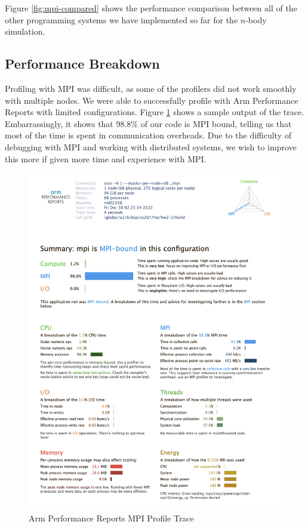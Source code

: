 \documentclass{article}
\begin{document}
Figure \ref{fig:mpi-compared} shows the performance comparison between all of the other programming systems we have implemented so far for the $n$-body simulation.

\subsection{Performance Breakdown}

Profiling with MPI was difficult, as some of the profilers did not work smoothly with multiple nodes. We were able to successfully profile with Arm Performance Reports with limited configurations. Figure \ref{fig:mpi-profile-trace} shows a sample output of the trace. Embarrassingly, it shows that 98.8\% of our code is MPI bound, telling us that most of the time is spent in communication overheads. Due to the difficulty of debugging with MPI and working with distributed systems, we wish to improve this more if given more time and experience with MPI.

\begin{figure}[H]
	\centering
	\includegraphics[width=6in]{figures/mpi_profile.png}
	\caption{Arm Performance Reports MPI Profile Trace}
	\label{fig:mpi-profile-trace}
\end{figure}
\end{document}
